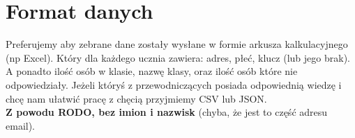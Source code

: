 \section{Format danych}

Preferujemy aby zebrane dane zostały wysłane w formie arkusza kalkulacyjnego (np Excel). Który dla każdego ucznia zawiera: adres, płeć, klucz (lub jego brak). A ponadto ilość osób w klasie, nazwę klasy, oraz ilość osób które nie odpowiedziały. Jeżeli któryś z przewodniczących posiada odpowiednią wiedzę i chcę nam ułatwić pracę z chęcią przyjmiemy CSV lub JSON.\\ \textbf{Z powodu RODO, bez imion i nazwisk} (chyba, że jest to część adresu email).
